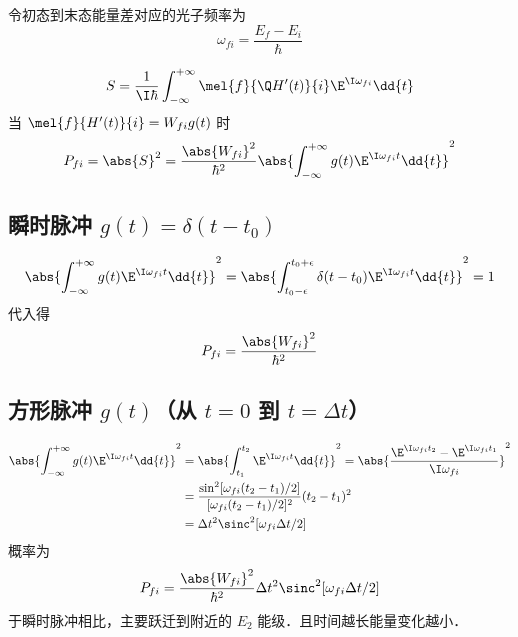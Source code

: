 

令初态到末态能量差对应的光子频率为
\begin{equation}
\omega_{fi} = \frac{E_f - E_i}{\hbar}
\end{equation}

\begin{equation}
S = \frac{1}{\I\hbar} \int_{-\infty}^{+\infty} \mel{f}{\Q H'(t)}{i} \E^{\I\omega_{fi}} \dd{t}
\end{equation}
当 $\mel{f}{H'(t)}{i} = W_{fi} g(t)$ 时
\begin{equation}
P_{fi} = \abs{S}^2 = \frac{\abs{W_{fi}}^2}{\hbar^2} \abs{\int_{-\infty}^{+\infty} g(t) \E^{\I\omega_{fi} t} \dd{t}}^2
\end{equation}

\subsection{瞬时脉冲 $g(t) = \delta(t-t_0)$}
\begin{equation}
\abs{\int_{-\infty}^{+\infty} g(t) \E^{\I\omega_{fi} t} \dd{t}}^2
= \abs{\int_{t_0-\epsilon}^{t_0+\epsilon} \delta(t-t_0) \E^{\I\omega_{fi} t} \dd{t}}^2
= 1
\end{equation}
代入得
\begin{equation}
P_{fi} = \frac{\abs{W_{fi}}^2}{\hbar^2}
\end{equation}

\subsection{方形脉冲 $g(t)$（从 $t=0$ 到 $t=\Delta t$）}
\begin{equation}\begin{aligned}
\abs{\int_{-\infty}^{+\infty} g(t) \E^{\I\omega_{fi}t} \dd{t}}^2
&= \abs{\int_{t_1}^{t_2} \E^{\I\omega_{fi}t} \dd{t}}^2
= \abs{\frac{\E^{\I\omega_{fi}t_2} - \E^{\I\omega_{fi}t_1}}{\I\omega_{fi}}}^2\\
&= \frac{\sin^2[\omega_{fi}(t_2-t_1)/2]}{[\omega_{fi}(t_2-t_1)/2]^2} (t_2-t_1)^2 \\
&= \Delta t^2 \sinc^2[\omega_{fi}\Delta t/2]
\end{aligned}\end{equation}
概率为
\begin{equation}\label{TDPEx_eq2}
P_{fi} = \frac{\abs{W_{fi}}^2}{\hbar^2} \Delta t^2 \sinc^2[\omega_{fi}\Delta t/2]
\end{equation}
于瞬时脉冲相比，主要跃迁到附近的 $E_2$ 能级．且时间越长能量变化越小．

